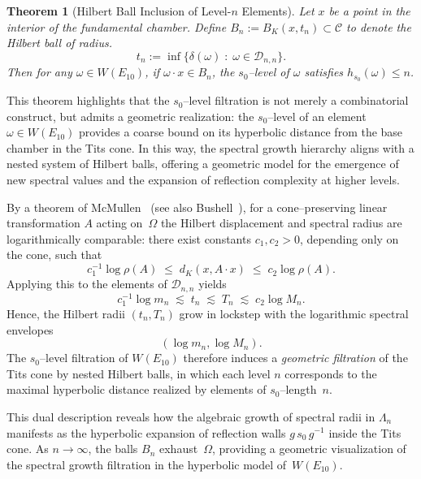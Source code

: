 \documentclass[11pt]{amsart}
\numberwithin{equation}{section}
\newtheorem{thm}{Theorem}[section]
\begin{document}
\begin{thm}[Hilbert Ball Inclusion of Level-$n$ Elements]\label{T:hilbertBall}
Let $x$ be a point in the interior of the fundamental chamber.
Define $B_n := B_K(x, t_n) \subset \mathcal{C}$ to denote the Hilbert ball of radius.
\[
t_n := \inf\bigl\{\delta(\omega) \;:\; \omega \in \mathcal{D}_{n,n}\bigr\}.
\]
Then for any $\omega \in W(E_{10})$, if $\omega \cdot x \in B_n$,
the $s_0$--level of $\omega$ satisfies $h_{s_0}(\omega) \le n$.
\end{thm}

\medskip
This theorem highlights that the $s_0$--level filtration is not merely a combinatorial construct, but admits a geometric realization: the $s_0$--level of an element $\omega\in W(E_{10})$ provides a coarse bound on its hyperbolic distance from the base chamber in the Tits cone. In this way, the spectral growth hierarchy aligns with a nested system of Hilbert balls, offering a geometric model for the emergence of new spectral values and the expansion of reflection complexity at higher levels.

\medskip
By a theorem of McMullen~\cite[Prop.~4.1]{McMullen:2002}
(see also Bushell~\cite{Bushell:1973}),
for a cone--preserving linear transformation $A$ acting on~$\Omega$
the Hilbert displacement and spectral radius are logarithmically comparable:
there exist constants $c_1,c_2>0$, depending only on the cone,
such that
\[
c_1^{-1}\log\rho(A)
\;\le\;
d_K(x,A\!\cdot\!x)
\;\le\;
c_2\log\rho(A).
\]
Applying this to the elements of $\mathcal{D}_{n,n}$ yields
\[
c_1^{-1}\log m_n
\;\lesssim\;
t_n
\;\lesssim\;
T_n
\;\lesssim\;
c_2\log M_n.
\]
Hence, the Hilbert radii $(t_n,T_n)$ grow in lockstep with the
logarithmic spectral envelopes \[(\log m_n,\log M_n).\]
The $s_0$--level filtration of $W(E_{10})$ therefore induces a
\emph{geometric filtration} of the Tits cone by nested Hilbert balls,
in which each level $n$ corresponds to the maximal hyperbolic distance
realized by elements of $s_0$--length~$n$.




\medskip
This dual description reveals how the algebraic growth of
spectral radii in $\Lambda_n$ manifests as the hyperbolic
expansion of reflection walls $g\,s_0\,g^{-1}$ inside the Tits cone.
As $n\to\infty$, the balls $B_n$ exhaust~$\Omega$, providing a
geometric visualization of the spectral growth filtration
in the hyperbolic model of~$W(E_{10})$.
\end{document}

